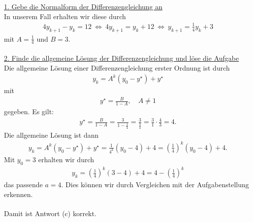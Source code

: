 \underline{1. Gebe die Normalform der Differenzengleichung an}\\
In unserem Fall erhalten wir diese durch
\begin{align*}
4 y_{k+1} -y_k = 12 \ 
\Leftrightarrow \
4 y_{k+1} = y_k + 12
\ \Leftrightarrow \
y_{k+1} = \frac{1}{4} y_k + 3
\end{align*}
mit $A = \frac{1}{4} $ und $B = 3$.\\
\\
\underline{2. Finde die allgemeine Lösung der Differenzengleichung und löse die Aufgabe}\\
Die allgemeine Lösung einer Differenzengleichung erster Ordnung ist durch
\begin{align*}
y_k = A^k (y_0 - y^\star)  + y^\star
\end{align*}
mit
\begin{align*}
y^\star 
= \frac{B}{1 -A }, \quad A \neq 1 
\end{align*}
gegeben.
Es gilt:
\begin{align*}
y^\star 
= \frac{B}{1 -A }
= \frac{3}{1 - \frac{1}{4} }
= \frac{3}{\frac{3}{4}}
= \frac{3}{1} \cdot \frac{4}{3} = 4.
\end{align*}
Die allgemeine Lösung ist dann
\begin{align*}
y_k = A^k (y_0 - y^\star)  + y^\star
= \frac{1}{4^k} ( y_0 - 4 ) +4
=
\left( \frac{1}{4} \right)^k(y_0 -4) +4.
\end{align*}
Mit $y_0 = 3$ erhalten wir durch
\begin{align*}
y_k = \left( \frac{1}{4} \right)^k ( 3 - 4 ) +4
=  4 - \left( \frac{1}{4} \right)^k
\end{align*}
das passende $a = 4$.
Dies können wir durch Vergleichen mit der Aufgabenstellung erkennen.\\
\\
Damit ist Antwort (c) korrekt.

\newpage



